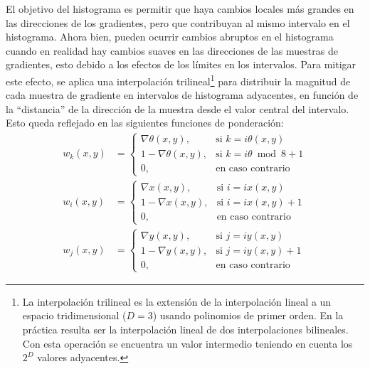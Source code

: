 El objetivo del histograma es permitir que haya cambios locales más grandes en las direcciones de los gradientes, pero que contribuyan al mismo intervalo en el histograma.
Ahora bien, pueden ocurrir cambios abruptos en el histograma cuando en realidad hay cambios suaves en las direcciones de las muestras de gradientes, esto debido a los efectos de los límites en los intervalos.
Para mitigar este efecto, se aplica una interpolación trilineal\footnote{La interpolación trilineal es la extensión de la interpolación lineal a un espacio tridimensional ($D = 3$) usando polinomios de primer orden. En la práctica resulta ser la interpolación lineal de dos interpolaciones bilineales. Con esta operación se encuentra un valor intermedio teniendo en cuenta los $2^D$ valores adyacentes.} para distribuir la magnitud de cada muestra de gradiente en intervalos de histograma adyacentes, en función de la ``distancia'' de la dirección de la muestra desde el valor central del intervalo.
Esto queda reflejado en las siguientes funciones de ponderación:
%
\begin{subequations}
    \begin{align}
        w_k(x, y) &= \left\{\begin{matrix}
                                \nabla\theta(x, y),     & \text{si } k = i\theta(x, y)       \\
                                1 - \nabla\theta(x, y), & \text{si } k = i\theta \bmod 8 + 1 \\
                                0,                      & \text{en caso contrario}
        \end{matrix} \right. \label{eq:sift_trilineal_weighting_1} \\
        w_i(x, y) &= \left\{\begin{matrix}
                                \nabla x(x, y),     & \text{si } i = ix(x, y)     \\
                                1 - \nabla x(x, y), & \text{si } i = ix(x, y) + 1 \\
                                0,                  & \text{en caso contrario}
        \end{matrix} \right. \label{eq:sift_trilineal_weighting_2} \\
        w_j(x, y) &= \left\{\begin{matrix}
                                \nabla y(x, y),     & \text{si } j = iy(x, y)     \\
                                1 - \nabla y(x, y), & \text{si } j = iy(x, y) + 1 \\
                                0,                  & \text{en caso contrario}
        \end{matrix} \right. \label{eq:sift_trilineal_weighting_3}
    \end{align}
\end{subequations}
